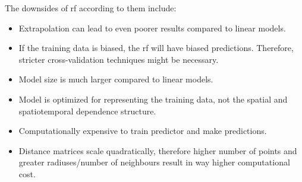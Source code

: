 The downsides of \gls{rf} according to them include:

\begin{itemize}
    \item Extrapolation can lead to even poorer results compared to linear models.
    \item If the training data is biased, the \gls{rf} will have biased predictions. Therefore, stricter cross-validation techniques might be necessary.
    \item Model size is much larger compared to linear models.
    \item Model is optimized for representing the training data, not the spatial and spatiotemporal dependence structure.
    \item Computationally expensive to train predictor and make predictions.
    \item Distance matrices scale quadratically, therefore higher number of points and greater radiuses/number of neighbours result in way higher computational cost. 
\end{itemize}

